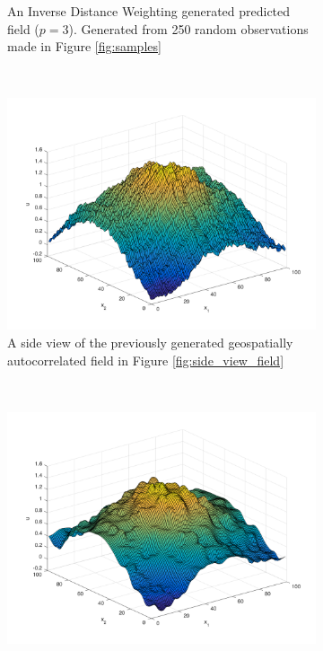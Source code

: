 \documentclass[11pt]{ucthesis}
\begin{document}
\begin{figure}[ht!]
\begin{subfigure}[t]{0.5\textwidth}
		\captionsetup{skip=0.5\baselineskip, width=0.8\textwidth, size=footnotesize}
		\caption{An Inverse Distance Weighting generated predicted field ($p=3$). Generated from 250 random observations made in Figure \ref{fig:samples}}
		\label{fig:idw_field}
    \end{subfigure}
    \\
    \begin{subfigure}[t]{0.5\textwidth}
        \centering
        \includegraphics[width=\linewidth]{figures/generated_field_side_view.png}
        \captionsetup{skip=0.5\baselineskip, width=0.8\textwidth, size=footnotesize}
        \caption{A side view of the previously generated geospatially autocorrelated field in Figure \ref{fig:side_view_field}}
    \end{subfigure}%
    ~
    \begin{subfigure}[t]{0.5\textwidth}
        \centering
        \includegraphics[width=\linewidth]{figures/idw_side_pred_field.png}

\end{subfigure}
\end{figure}
\end{document}
